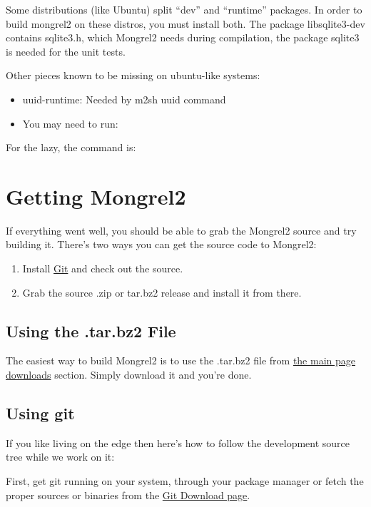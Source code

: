 Some distributions (like Ubuntu) split ``dev'' and ``runtime'' packages.
In order to build mongrel2 on these distros, you must install both.
The package libsqlite3-dev contains sqlite3.h, which Mongrel2 needs during
compilation, the package sqlite3 is needed for the unit tests.

Other pieces known to be missing on ubuntu-like systems:

\begin{itemize}
\item uuid-runtime: Needed by m2sh uuid command
\item You may need to run: 
\end{itemize}

For the lazy, the command is: 


\section{Getting Mongrel2}

If everything went well, you should be able to grab the Mongrel2 source
and try building it.  There's two ways you can get the source code to
Mongrel2:

\begin{enumerate}
\item Install \href{http://git-scm.org}{Git} and check out the source.
\item Grab the source .zip or tar.bz2 release and install it from there.
\end{enumerate}


\subsection{Using the .tar.bz2 File}

The easiest way to build Mongrel2 is to use the .tar.bz2 file from 
\href{http://mongrel2.org/home#download}{the main page downloads} section.
Simply download it and you're done.


\subsection{Using git}

If you like living on the edge then here's how to follow the development source
tree while we work on it:

First, get git running on your system, through your package manager or fetch
the proper sources or binaries from the \href{http://git-scm.com/download}{Git Download page}.

